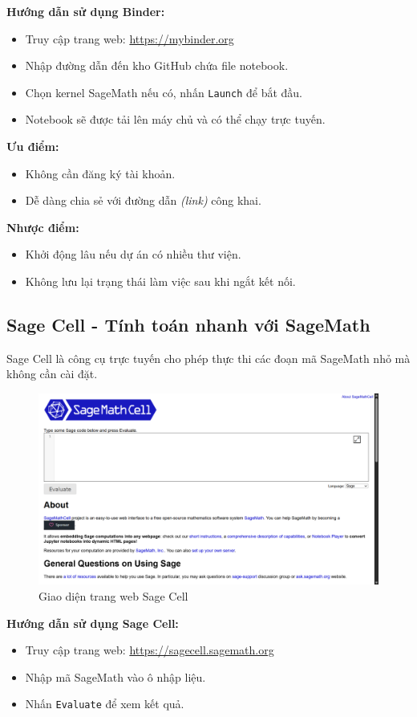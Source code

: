 \textbf{Hướng dẫn sử dụng Binder:}
\begin{itemize}
	\item Truy cập trang web: \url{https://mybinder.org}
	\item Nhập đường dẫn đến kho GitHub chứa file notebook.
	\item Chọn kernel SageMath nếu có, nhấn \texttt{Launch} để bắt đầu.
	\item Notebook sẽ được tải lên máy chủ và có thể chạy trực tuyến.
\end{itemize}

\textbf{Ưu điểm:}
\begin{itemize}
	\item Không cần đăng ký tài khoản.
	\item Dễ dàng chia sẻ với đường dẫn \textit{(link)} công khai.
\end{itemize}

\textbf{Nhược điểm:}
\begin{itemize}
	\item Khởi động lâu nếu dự án có nhiều thư viện.
	\item Không lưu lại trạng thái làm việc sau khi ngắt kết nối.
\end{itemize}

\subsection{Sage Cell - Tính toán nhanh với SageMath}

Sage Cell là công cụ trực tuyến cho phép thực thi các đoạn mã SageMath nhỏ mà không cần cài đặt.
\begin{figure}[H]
	\centering
	\includegraphics[width=0.7\linewidth]{images/screenshot002}
	\caption{Giao diện trang web Sage Cell}
	\label{fig:screenshot002}
\end{figure}

\textbf{Hướng dẫn sử dụng Sage Cell:}
\begin{itemize}
	\item Truy cập trang web: \url{https://sagecell.sagemath.org}
	\item Nhập mã SageMath vào ô nhập liệu.
	\item Nhấn \texttt{Evaluate} để xem kết quả.
\end{itemize}

